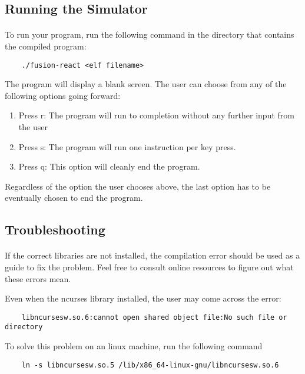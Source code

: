 \documentclass[letterpaper, 11pt, twoside]{article}
\begin{document}
\subsection[Simulator Command]{Running the Simulator}
\paragraph{}
\begin{flushleft}
To run your program, run the following command in the directory that contains the compiled program:
\begin{lstlisting}
	./fusion-react <elf filename>
\end{lstlisting}

The program will display a blank screen. The user can choose  from any of the following options going forward:
\begin{enumerate}
	\item Press r: The program will run to completion without any further input from the user
	\item Press s: The program will run one instruction per key press.
	\item Press q: This option will cleanly end the program.
\end{enumerate}

Regardless of the option the user chooses above, the last option has to be eventually chosen to end the program.
\end{flushleft}

\subsection{Troubleshooting}
\paragraph{}
\begin{flushleft}
If the correct libraries are not installed, the compilation error should be used as a guide to fix the problem. Feel free to consult online resources to figure out what these errors mean. 

Even when the ncurses library installed, the user may come across the error:
\begin{lstlisting}
	libncursesw.so.6:cannot open shared object file:No such file or directory
\end{lstlisting}
To solve this problem on an linux machine, run the following command
\begin{lstlisting}
	ln -s libncursesw.so.5 /lib/x86_64-linux-gnu/libncursesw.so.6
\end{lstlisting}
\end{flushleft}
\end{document}
